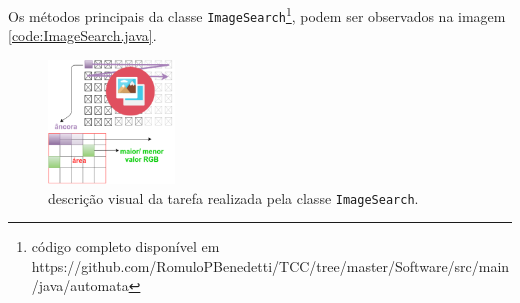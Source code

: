 \documentclass[tg]{mdtufsm}
\begin{document}
    Os métodos principais da classe \texttt{ImageSearch}\footnote{código completo disponível em https://github.com/RomuloPBenedetti/TCC/tree/master/Software/src/main/java/automata}, podem ser observados na imagem \ref{code:ImageSearch.java}.

    \begin{figure}[!htb]
        {\centering
        \includegraphics[width=0.3\textwidth]{imagens/searchImage.png}
        \caption{descrição visual da tarefa realizada pela classe \texttt{ImageSearch}.}
        \label{fig:ImageSearch}}
    \end{figure}
\end{document}
